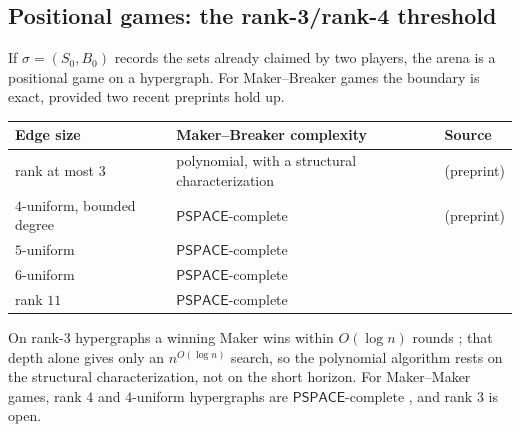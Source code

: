\documentclass[final]{siamart0516}
\numberwithin{theorem}{section}
\numberwithin{equation}{section}
\theoremstyle{siamnonum}
\theoremstyle{plain}
\newcommand{\cls}[1]{\mathsf{#1}}
\newcommand{\PSPACE}{\cls{PSPACE}}
\begin{document}
\subsection{Positional games: the rank-3/rank-4 threshold}\label{ssec:positional}
If $\sigma=(S_0,B_0)$ records the sets already claimed by two players, the arena is a positional game on a hypergraph. For Maker--Breaker games the boundary is exact, provided two recent preprints hold up.
\begin{center}\small
\begin{tabularx}{\linewidth}{@{}l>{\raggedright\arraybackslash}Xl@{}}
\toprule
Edge size & Maker--Breaker complexity & Source\\ \midrule
rank at most $3$ & polynomial, with a structural characterization & \cite{GGS} (preprint)\\
$4$-uniform, bounded degree & $\PSPACE$-complete & \cite{Galliot25} (preprint)\\
$5$-uniform & $\PSPACE$-complete & \cite{Koepke}\\
$6$-uniform & $\PSPACE$-complete & \cite{RahmanWatson}\\
rank $11$ & $\PSPACE$-complete & \cite{SchaeferGames}\\
\bottomrule
\end{tabularx}
\end{center}
On rank-$3$ hypergraphs a winning Maker wins within $O(\log n)$ rounds \cite{GGS}; that depth alone gives only an $n^{O(\log n)}$ search, so the polynomial algorithm rests on the structural characterization, not on the short horizon. For Maker--Maker games, rank $4$ and $4$-uniform hypergraphs are $\PSPACE$-complete \cite{GalliotSenizergues,Galliot25}, and rank $3$ is open.
\end{document}
